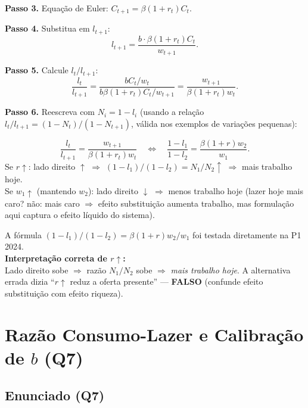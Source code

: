 \documentclass[12pt, a4paper]{article}
\begin{document}
\textbf{Passo 3.} Equação de Euler: $C_{t+1} = \beta(1+r_t)C_t$.

\textbf{Passo 4.} Substitua em $l_{t+1}$:
\[
l_{t+1} = \frac{b\cdot\beta(1+r_t)C_t}{w_{t+1}}.
\]

\textbf{Passo 5.} Calcule $l_t/l_{t+1}$:
\[
\frac{l_t}{l_{t+1}} = \frac{bC_t/w_t}{b\beta(1+r_t)C_t/w_{t+1}} = \frac{w_{t+1}}{\beta(1+r_t)w_t}.
\]

\textbf{Passo 6.} Reescreva com $N_i = 1-l_i$ (usando a relação $l_t/l_{t+1} = (1-N_t)/(1-N_{t+1})$, válida nos exemplos de variações pequenas):

\begin{formulabox}[title={Substituição Intertemporal de Lazer/Trabalho}]
\[
\frac{l_t}{l_{t+1}} = \frac{w_{t+1}}{\beta(1+r_t)w_t} \quad\Longleftrightarrow\quad \frac{1-l_1}{1-l_2} = \frac{\beta(1+r)w_2}{w_1}.
\]
Se $r\uparrow$: lado direito $\uparrow$ $\Rightarrow$ $(1-l_1)/(1-l_2) = N_1/N_2\uparrow$ $\Rightarrow$ mais trabalho hoje.\\
Se $w_1\uparrow$ (mantendo $w_2$): lado direito $\downarrow$ $\Rightarrow$ menos trabalho hoje (lazer hoje mais caro? não: mais caro $\Rightarrow$ efeito substituição aumenta trabalho, mas formulação aqui captura o efeito líquido do sistema).
\end{formulabox}

\begin{provabox}[title={Q6 / P1 2024 Q2 --- Fórmula Diretamente Testada}]
A fórmula $(1-l_1)/(1-l_2) = \beta(1+r)w_2/w_1$ foi testada diretamente na P1 2024.\\
\textbf{Interpretação correta de $r\uparrow$:}\\
Lado direito sobe $\Rightarrow$ razão $N_1/N_2$ sobe $\Rightarrow$ \emph{mais trabalho hoje}. A alternativa errada dizia ``$r\uparrow$ reduz a oferta presente'' --- \textbf{FALSO} (confunde efeito substituição com efeito riqueza).
\end{provabox}

\section{Razão Consumo-Lazer e Calibração de $b$ (Q7)}

\subsection*{Enunciado (Q7)}
\end{document}
